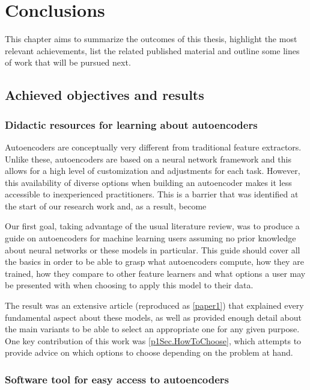 \setchapterpreamble[u]{\margintoc}
\chapter{Conclusions}
\label{ch:conclusions}

This chapter aims to summarize the outcomes of this thesis, highlight the most relevant achievements, list the related published material and outline some lines of work that will be pursued next.

\section{Achieved objectives and results}

\subsection{Didactic resources for learning about autoencoders}

Autoencoders are conceptually very different from traditional feature extractors. Unlike these, autoencoders are based on a neural network framework and this allows for a high level of customization and adjustments for each task. However, this availability of diverse options when building an autoencoder makes it less accessible to inexperienced practitioners. This is a barrier that was identified at the start of our research work and, as a result, become 

Our first goal, taking advantage of the usual literature review, was to produce a guide on autoencoders for machine learning users assuming no prior knowledge about neural networks or these models in particular. This guide should cover all the basics in order to be able to grasp what autoencoders compute, how they are trained, how they compare to other feature learners and what options a user may be presented with when choosing to apply this model to their data.

The result was an extensive article (reproduced as \autoref{paper1}) that explained every fundamental aspect about these models, as well as provided enough detail about the main variants to be able to select an appropriate one for any given purpose. One key contribution of this work was \autoref{p1Sec.HowToChoose}, which attempts to provide advice on which options to choose depending on the problem at hand.

\subsection{Software tool for easy access to autoencoders}

